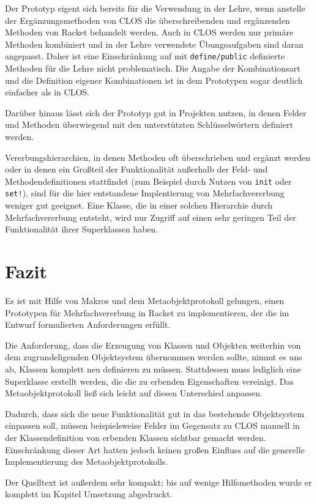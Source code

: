 Der Prototyp eigent sich bereits für die Verwendung in der Lehre, wenn anstelle der Ergänzungsmethoden von CLOS die überschreibenden und ergänzenden Methoden von Racket behandelt werden. Auch in CLOS werden nur primäre Methoden kombiniert und in der Lehre verwendete Übungsaufgaben sind daran angepasst. Daher ist eine Einschränkung auf mit \texttt{define/public} definierte Methoden für die Lehre nicht problematisch. Die Angabe der Kombinationsart und die Definition eigener Kombinationen ist in dem Prototypen sogar deutlich einfacher als in CLOS.

Darüber hinaus lässt sich der Prototyp gut in Projekten nutzen, in denen Felder und Methoden überwiegend mit den unterstützten Schlüsselwörtern definiert werden. 

Vererbungshierarchien, in denen Methoden oft überschrieben und ergänzt werden oder in denen ein Großteil der Funktionalität außerhalb der Feld- und Methodendefinitionen stattfindet (zum Beispiel durch Nutzen von \texttt{init} oder \texttt{set!}), sind für die hier entstandene Implentierung von Mehrfachvererbung weniger gut geeignet. Eine Klasse, die in einer solchen Hierarchie durch Mehrfachvererbung entsteht, wird nur Zugriff auf einen sehr geringen Teil der Funktionalität ihrer Superklassen haben.

\section{Fazit}
Es ist mit Hilfe von Makros und dem Metaobjektprotokoll gelungen, einen Prototypen für Mehrfachvererbung in Racket zu implementieren, der die im Entwurf formulierten Anforderungen erfüllt.

Die Anforderung, dass die Erzeugung von Klassen und Objekten weiterhin von dem zugrundeligenden Objektsystem übernommen werden sollte, nimmt es uns ab, Klassen komplett neu definieren zu müssen. Stattdessen muss lediglich eine Superklasse erstellt werden, die die zu erbenden Eigenschaften vereinigt. Das Metaobjektprotokoll ließ sich leicht auf diesen Unterschied anpassen.

Dadurch, dass sich die neue Funktionalität gut in das bestehende Objektsystem einpassen soll, müssen beispielsweise Felder im Gegensatz zu CLOS manuell in der Klassendefinition von erbenden Klassen sichtbar gemacht werden. Einschränkung dieser Art hatten jedoch keinen großen Einfluss auf die generelle Implementierung des Metaobjektprotokolls.

Der Quelltext ist außerdem sehr kompakt; bis auf wenige Hilfsmethoden wurde er komplett im Kapitel Umsetzung abgedruckt.

